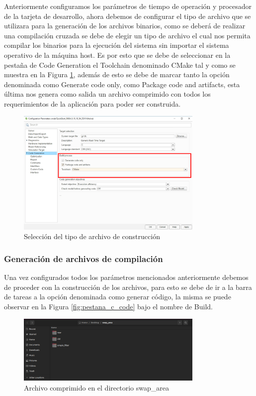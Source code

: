 Anteriormente configuramos los parámetros de tiempo de operación y procesador de la tarjeta de desarrollo, ahora debemos de configurar el tipo de archivo que se utilizara para la generación de los archivos binarios, como se deberá de realizar una compilación cruzada se debe de elegir un tipo de archivo el cual nos permita compilar los binarios para la ejecución del sistema sin importar el sistema operativo de la máquina host. Es por esto que se debe de seleccionar en la pestaña de Code Generation el Toolchain denominado CMake tal y como se muestra en la Figura \ref{fig:pestana_config_output_file}, además de esto se debe de marcar tanto la opción denominada como Generate code only, como Package code and artifacts, esta última nos genera como salida un archivo comprimido con todos los requerimientos de la aplicación para poder ser construida.


\begin{figure}[h!]
    \centering
    \includegraphics[width=0.8\textwidth]{fig/especifico_2/M2MT/paso_a_paso_mtmt/configuration_output_file.pdf}
    \caption{Selección del tipo de archivo de construcción}
    \label{fig:pestana_config_output_file}
\end{figure}

\subsubsection{Generación de archivos de compilación}

Una vez configurados todos los parámetros mencionados anteriormente debemos de proceder con la construcción de los archivos, para esto se debe de ir a la barra de tareas a la opción denominada como generar código, la misma se puede observar en la Figura \ref{fig:pestana_c_code} bajo el nombre de Build.

\begin{figure}[h!]
    \centering
    \includegraphics[width=0.8\textwidth]{fig/especifico_2/M2MT/paso_a_paso_mtmt/root_folder.pdf}
    \caption{Archivo comprimido en el directorio swap\_area}
    \label{fig:pestana_swap_area}
\end{figure}

